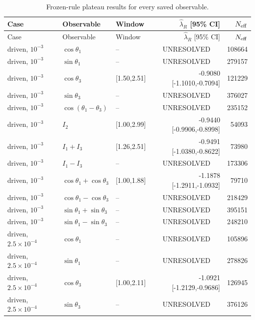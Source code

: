 \begin{longtable}{lllrr}
\caption{Frozen-rule plateau results for every saved observable.}\label{tab:allrates}\\
\toprule Case & Observable & Window & $\widehat\lambda_R$ [95\% CI] & $N_{\rm eff}$ \\
\midrule\endfirsthead
\toprule Case & Observable & Window & $\widehat\lambda_R$ [95\% CI] & $N_{\rm eff}$ \\
\midrule\endhead
driven, $10^{-3}$ & $\cos\theta_1$ & -- & \multicolumn{1}{c}{UNRESOLVED} & 108664 \\
driven, $10^{-3}$ & $\sin\theta_1$ & -- & \multicolumn{1}{c}{UNRESOLVED} & 279157 \\
driven, $10^{-3}$ & $\cos\theta_3$ & [1.50,2.51] & -0.9080 [-1.1010,-0.7094] & 121229 \\
driven, $10^{-3}$ & $\sin\theta_3$ & -- & \multicolumn{1}{c}{UNRESOLVED} & 376027 \\
driven, $10^{-3}$ & $\cos(\theta_1-\theta_3)$ & -- & \multicolumn{1}{c}{UNRESOLVED} & 235152 \\
driven, $10^{-3}$ & $I_2$ & [1.00,2.99] & -0.9440 [-0.9906,-0.8998] & 54093 \\
driven, $10^{-3}$ & $I_1+I_3$ & [1.26,2.51] & -0.9491 [-1.0380,-0.8622] & 73980 \\
driven, $10^{-3}$ & $I_1-I_3$ & -- & \multicolumn{1}{c}{UNRESOLVED} & 173306 \\
driven, $10^{-3}$ & $\cos\theta_1+\cos\theta_3$ & [1.00,1.88] & -1.1878 [-1.2911,-1.0932] & 79710 \\
driven, $10^{-3}$ & $\cos\theta_1-\cos\theta_3$ & -- & \multicolumn{1}{c}{UNRESOLVED} & 218429 \\
driven, $10^{-3}$ & $\sin\theta_1+\sin\theta_3$ & -- & \multicolumn{1}{c}{UNRESOLVED} & 395151 \\
driven, $10^{-3}$ & $\sin\theta_1-\sin\theta_3$ & -- & \multicolumn{1}{c}{UNRESOLVED} & 248210 \\
\addlinespace
driven, $2.5\!\times\!10^{-4}$ & $\cos\theta_1$ & -- & \multicolumn{1}{c}{UNRESOLVED} & 105896 \\
driven, $2.5\!\times\!10^{-4}$ & $\sin\theta_1$ & -- & \multicolumn{1}{c}{UNRESOLVED} & 278826 \\
driven, $2.5\!\times\!10^{-4}$ & $\cos\theta_3$ & [1.00,2.11] & -1.0921 [-1.2129,-0.9686] & 126945 \\
driven, $2.5\!\times\!10^{-4}$ & $\sin\theta_3$ & -- & \multicolumn{1}{c}{UNRESOLVED} & 376126 \\

\end{longtable}
